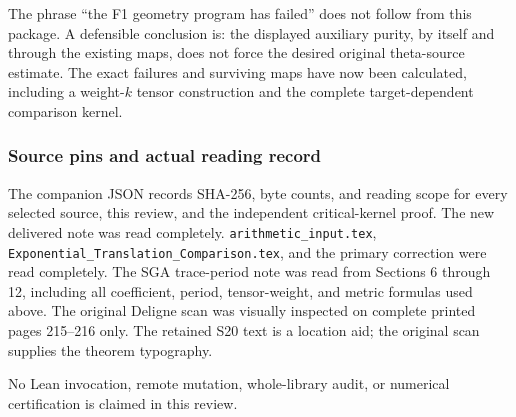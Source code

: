 The phrase ``the F1 geometry program has failed'' does not follow from this package. A defensible conclusion is: the displayed auxiliary purity, by itself and through the existing maps, does not force the desired original theta-source estimate. The exact failures and surviving maps have now been calculated, including a weight-\(k\) tensor construction and the complete target-dependent comparison kernel.

\subsubsection{Source pins and actual reading record}\label{endpoint-purity_review--source-pins-and-actual-reading-record}

The companion JSON records SHA-256, byte counts, and reading scope for every selected source, this review, and the independent critical-kernel proof. The new delivered note was read completely. \nolinkurl{arithmetic_input.tex}, \nolinkurl{Exponential_Translation_Comparison.tex}, and the primary correction were read completely. The SGA trace-period note was read from Sections 6 through 12, including all coefficient, period, tensor-weight, and metric formulas used above. The original Deligne scan was visually inspected on complete printed pages 215--216 only. The retained S20 text is a location aid; the original scan supplies the theorem typography.

No Lean invocation, remote mutation, whole-library audit, or numerical certification is claimed in this review.
